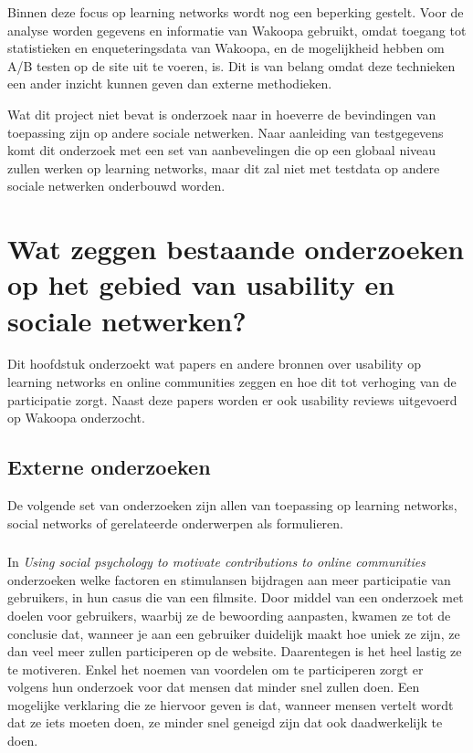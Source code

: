 \documentclass[a4paper, 10pt, pdftex]{report}
\begin{document}
    Binnen deze focus op learning networks wordt nog een beperking gestelt. Voor de analyse worden gegevens en informatie van Wakoopa gebruikt, omdat toegang tot statistieken en enqueteringsdata van Wakoopa, en de mogelijkheid hebben om A/B testen op de site uit te voeren, is. Dit is van belang omdat deze technieken een ander inzicht kunnen geven dan externe methodieken.

    Wat dit project niet bevat is onderzoek naar in hoeverre de bevindingen van toepassing zijn op andere sociale netwerken. Naar aanleiding van testgegevens komt dit onderzoek met een set van aanbevelingen die op een globaal niveau zullen werken op learning networks, maar dit zal niet met testdata op andere sociale netwerken onderbouwd worden.

  \newpage
  \chapter{Wat zeggen bestaande onderzoeken op het gebied van usability en sociale netwerken?}
    \label{researchchapter}
    \newpage

    Dit hoofdstuk onderzoekt wat papers en andere bronnen over usability op learning networks en online communities zeggen en hoe dit tot verhoging van de participatie zorgt. Naast deze papers worden er ook usability reviews uitgevoerd op Wakoopa onderzocht.

    \section{Externe onderzoeken}
      De volgende set van onderzoeken zijn allen van toepassing op learning networks, social networks of gerelateerde onderwerpen als formulieren.
      \subsection{\cite{Beenen2004}}

      In \emph{Using social psychology to motivate contributions to online communities} onderzoeken \citeauthor{Beenen2004} welke factoren en stimulansen bijdragen aan meer participatie van gebruikers, in hun casus die van een filmsite. Door middel van een onderzoek met doelen voor gebruikers, waarbij ze de bewoording aanpasten, kwamen ze tot de conclusie dat, wanneer je aan een gebruiker duidelijk maakt hoe uniek ze zijn, ze dan veel meer zullen participeren op de website. Daarentegen is het heel lastig ze te motiveren. Enkel het noemen van voordelen om te participeren zorgt er volgens hun onderzoek voor dat mensen dat minder snel zullen doen. Een mogelijke verklaring die ze hiervoor geven is dat, wanneer mensen vertelt wordt dat ze iets moeten doen, ze minder snel geneigd zijn dat ook daadwerkelijk te doen.
\end{document}

